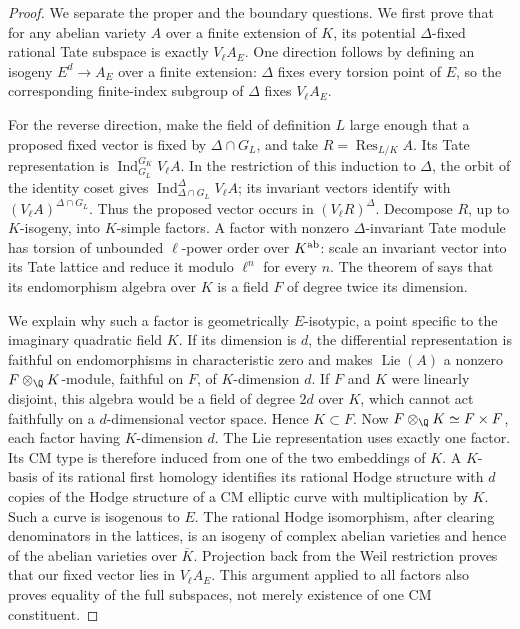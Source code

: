 \begin{proof}
We separate the proper and the boundary questions. We first prove that
for any abelian variety $A$ over a finite extension of $K$, its
potential $\Delta$-fixed rational Tate subspace is exactly $V_\ell A_E$.
One direction follows by defining an isogeny $E^d\to A_E$ over a
finite extension: $\Delta$ fixes every torsion point of $E$, so the
corresponding finite-index subgroup of $\Delta$ fixes $V_\ell A_E$.

For the reverse direction, make the field of definition $L$ large enough
that a proposed fixed vector is fixed by $\Delta\cap G_L$, and take
$R=\operatorname{Res}_{L/K}A$. Its Tate representation is
$\operatorname{Ind}_{G_L}^{G_K}V_\ell A$. In the restriction of this
induction to $\Delta$, the orbit of the identity coset gives
$\operatorname{Ind}_{\Delta\cap G_L}^{\Delta}V_\ell A$; its invariant
vectors identify with $(V_\ell A)^{\Delta\cap G_L}$. Thus the proposed
vector occurs in $(V_\ell R)^\Delta$. Decompose $R$, up to $K$-isogeny,
into $K$-simple factors. A factor with nonzero $\Delta$-invariant
Tate module has torsion of unbounded $\ell$-power order over $K^{\rm ab}$:
scale an invariant vector into its Tate lattice and reduce it modulo
$\ell^n$ for every $n$.
The theorem of \citet[\S1, Theorem; \S3, Case II]{Ruppert1998} says that
its endomorphism algebra over $K$ is a field $F$ of degree twice its
dimension.

We explain why such a factor is geometrically $E$-isotypic, a point
specific to the imaginary quadratic field $K$. If its dimension is $d$,
the differential representation is faithful on endomorphisms in
characteristic zero and makes $\operatorname{Lie}(A)$ a nonzero
$F\otimes_\Q K$-module, faithful on $F$, of $K$-dimension $d$. If $F$ and $K$ were
linearly disjoint, this algebra would be a field of degree $2d$ over $K$,
which cannot act faithfully on a $d$-dimensional vector space. Hence
$K\subset F$. Now $F\otimes_\Q K\simeq F\times F$, each factor
having $K$-dimension $d$. The Lie representation uses exactly one factor.
Its CM type is therefore induced from one of the two embeddings of $K$.
A $K$-basis of its rational first homology identifies its rational Hodge
structure with $d$ copies of the Hodge structure of a CM elliptic curve
with multiplication by $K$. Such a curve is isogenous to $E$.
The rational Hodge isomorphism, after clearing denominators in the
lattices, is an isogeny of complex abelian varieties and hence of the
abelian varieties over $\overline K$. Projection back from the Weil
restriction proves that our fixed vector lies in $V_\ell A_E$.
This argument applied to all factors also proves equality of the full
subspaces, not merely existence of one CM constituent.


\end{proof}
